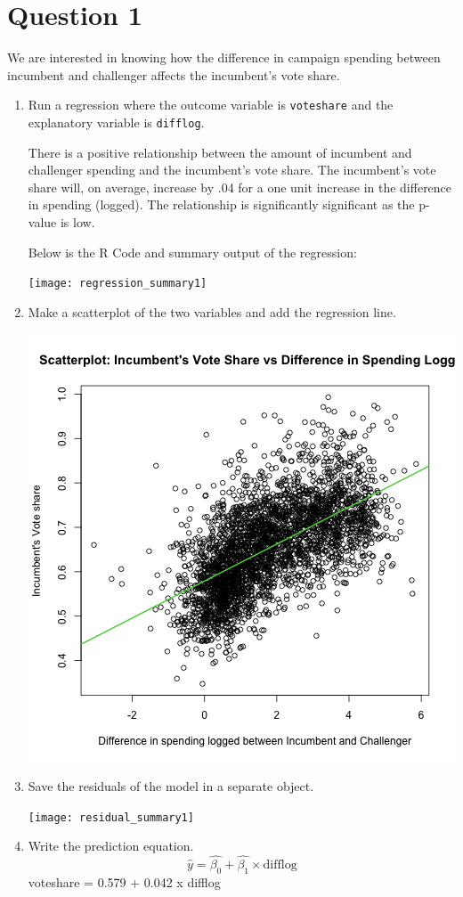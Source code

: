 \documentclass[12pt,letterpaper]{article}
\begin{document}
\section*{Question 1}
\vspace{.25cm}
\noindent We are interested in knowing how the difference in campaign spending between incumbent and challenger affects the incumbent's vote share. 
	\begin{enumerate}
		\item Run a regression where the outcome variable is \texttt{voteshare} and the explanatory variable is \texttt{difflog}.	\vspace{1cm}
		
		There is a positive relationship between the amount of incumbent and challenger spending and the incumbent's vote share. The incumbent's vote share will, on average, increase by .04 for a one unit increase in the difference in spending (logged). The relationship is significantly significant as the p-value is low. 
		
		Below is the R Code and summary output of the regression: 
		
		\texttt{[image: regression\_summary1]}
		
		\item Make a scatterplot of the two variables and add the regression line. 	
		
		\includegraphics[width=.75\textwidth]{votesshare_vs_difflog.png}
		
		
		
		
		\item Save the residuals of the model in a separate object.	\vspace{.1cm}
			
				\texttt{[image: residual\_summary1]}
		\item Write the prediction equation. 
		$$\hat{y}= \hat{\beta_0} + \hat{\beta_1} \times \text{difflog}$$
		voteshare = 0.579 + 0.042 x difflog
		

		
	\end{enumerate}
	
\end{document}
